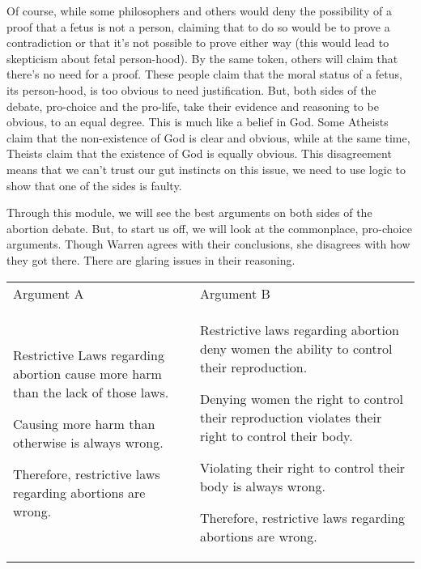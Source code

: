 Of course, while some philosophers and others would deny the possibility of a proof that a fetus is not a person, claiming that to do so would be to prove a contradiction or that it's not possible to prove either way (this would lead to skepticism about fetal person-hood). By the same token, others will claim that there's no need for a proof. These people claim that the moral status of a fetus, its person-hood, is too obvious to need justification. But, both sides of the debate, pro-choice and the pro-life, take their evidence and reasoning to be obvious, to an equal degree. This is much like a belief in God. Some Atheists claim that the non-existence of God is clear and obvious, while at the same time, Theists claim that the existence of God is equally obvious. This disagreement means that we can't trust our gut instincts on this issue, we need to use logic to show that one of the sides is faulty.

Through this module, we will see the best arguments on both sides of the abortion debate. But, to start us off, we will look at the commonplace, pro-choice arguments. Though Warren agrees with their conclusions, she disagrees with how they got there. There are glaring issues in their reasoning. 

\noindent \begin{tabular}{p{2in}|p{2.2in}}
Argument A&Argument B\\
    \begin{earg}
    \item[] Restrictive Laws regarding abortion cause more harm than the lack of those laws.
    \item[] Causing more harm than otherwise is always wrong.
    \item[] Therefore, restrictive laws regarding abortions are wrong.
\end{earg}&\begin{earg}
    \item[] Restrictive laws regarding abortion deny women the ability to control their reproduction.
    \item[] Denying women the right to control their reproduction violates their right to control their body.
    \item[] Violating their right to control their body is always wrong.
    \item[] Therefore, restrictive laws regarding abortions are wrong.
\end{earg}\\
\end{tabular}


